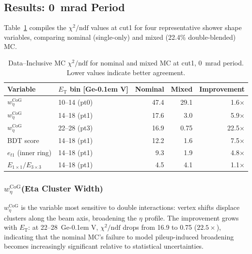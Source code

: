\documentclass[11pt,a4paper]{article}
\newcommand{\ET}{\ensuremath{E_{\text{T}}}\xspace}
\newcommand{\wetacog}{\ensuremath{w_{\eta}^{\mathrm{CoG}}}\xspace}
\newcommand{\chidf}{\ensuremath{\chi^2/\mathrm{ndf}}\xspace}
\newcommand{\GeV}{\ifmmode {\mathrm{\ Ge\kern -0.1em V}}\else\textrm{Ge\kern -0.1em V}\fi\xspace}
\begin{document}
\subsection{Results: 0~mrad Period}
\label{subsec:results_0mrad}

Table~\ref{tab:chi2_summary} compiles the \chidf values at cut1 for four
representative shower shape variables, comparing nominal (single-only) and mixed
(22.4\% double-blended) MC.

\begin{table}[H]
    \centering
    \caption{Data--Inclusive MC \chidf for nominal and mixed MC at cut1, 0~mrad
      period. Lower values indicate better agreement.}
    \label{tab:chi2_summary}
    \begin{tabular}{llrrr}
        \toprule
        Variable & \ET bin [\GeV] & Nominal & Mixed & Improvement \\
        \midrule
        \wetacog       & 10--14 (pt0) & 47.4 &  29.1 &  1.6$\times$ \\
        \wetacog       & 14--18 (pt1) & 17.6 &   3.0 &  5.9$\times$ \\
        \wetacog       & 22--28 (pt3) & 16.9 &   0.75 & 22.5$\times$ \\
        \midrule
        BDT score      & 14--18 (pt1) & 12.2 &   1.6 &  7.5$\times$ \\
        \midrule
        $e_{t1}$ (inner ring) & 14--18 (pt1) &  9.3 &   1.9 &  4.8$\times$ \\
        \midrule
        $E_{1\times1}/E_{3\times3}$ & 14--18 (pt1) &  4.5 &   4.1 &  1.1$\times$ \\
        \bottomrule
    \end{tabular}
\end{table}

\subsubsection{\wetacog (Eta Cluster Width)}

\wetacog is the variable most sensitive to double interactions: vertex shifts
displace clusters along the beam axis, broadening the $\eta$ profile.
The improvement grows with \ET: at 22--28~\GeV, \chidf drops from 16.9 to 0.75
($22.5\times$), indicating that the nominal MC's failure to model pileup-induced
broadening becomes increasingly significant relative to statistical uncertainties.
\end{document}
